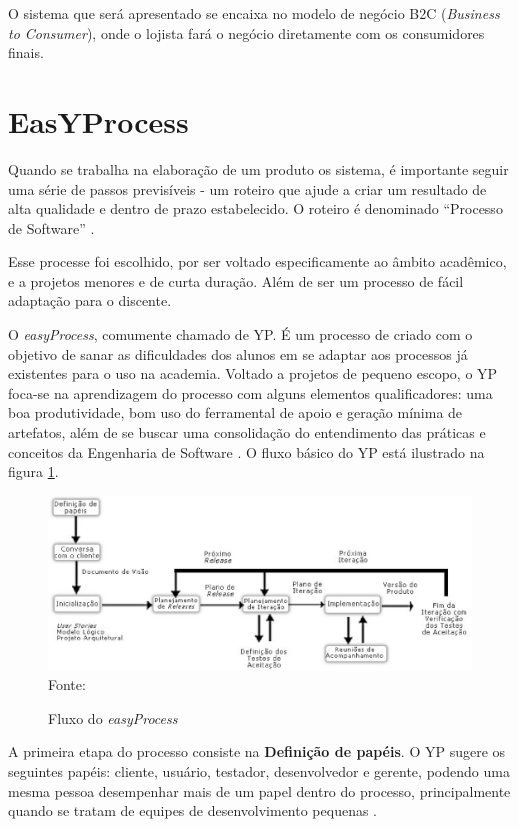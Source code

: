 \documentclass[a4paper,12pt]{monografia}
\begin{document}
O sistema que será apresentado se encaixa no modelo de negócio B2C (\textit{Business to Consumer}), onde o lojista fará o negócio diretamente com os consumidores finais.

\section{EasYProcess} %
\label{sec:yp}

Quando se trabalha na elaboração de um produto os sistema, é importante seguir uma série de passos previsíveis - um roteiro que ajude a criar um resultado de alta qualidade e dentro de prazo estabelecido. O roteiro é denominado ``Processo de Software'' \cite{pressman}.

Esse processe foi escolhido, por ser voltado especificamente ao âmbito acadêmico, e a projetos menores e de curta duração. Além de ser um processo de fácil adaptação para o discente.

O \textit{easyProcess}, comumente chamado de YP. É um processo de  criado com o objetivo de sanar as dificuldades dos alunos em se adaptar aos processos já existentes para o uso na academia. Voltado a projetos de pequeno escopo, o YP foca-se na aprendizagem do processo com alguns elementos qualificadores: uma boa produtividade, bom uso do ferramental de apoio e geração mínima de artefatos, além de se buscar uma consolidação do entendimento das práticas e conceitos da Engenharia de Software \cite{easyprocess}. O fluxo básico do YP está ilustrado na figura \ref{figura:yp}.

\begin{figure}[H]	
\centering
\caption{Fluxo do \textit{easyProcess}}
\includegraphics[width=15cm]{img/yp.eps}
\small{Fonte: \cite{easyprocess}}
\label{figura:yp}
\end{figure}

A primeira etapa do processo consiste na \textbf{Definição de papéis}. O YP sugere os seguintes papéis: cliente, usuário, testador, desenvolvedor e gerente, podendo uma mesma pessoa desempenhar mais de um papel dentro do processo, principalmente quando se tratam de equipes de desenvolvimento pequenas \cite{easyprocess}.
\end{document}
